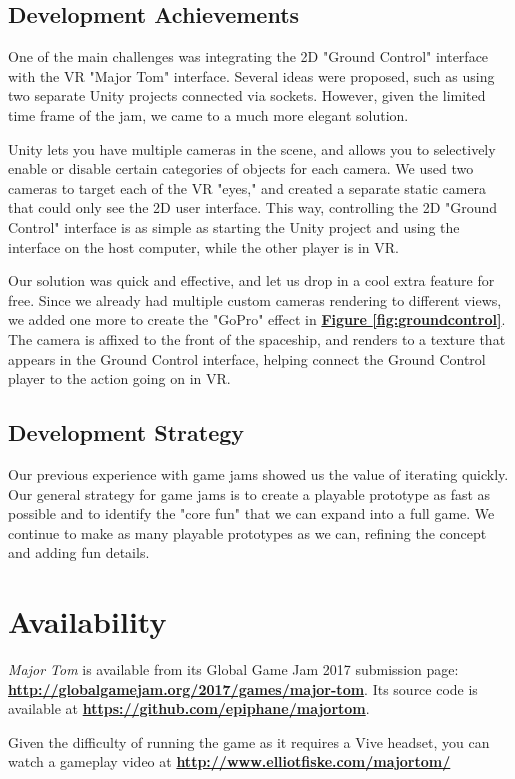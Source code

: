 \documentclass[sigconf]{acmart}
\begin{document}
\subsection{Development Achievements}
One of the main challenges was integrating the 2D "Ground Control" interface with the VR "Major Tom" interface. Several ideas were proposed, such as using two separate Unity projects connected via sockets. However, given the limited time frame of the jam, we came to a much more elegant solution. 

Unity lets you have multiple cameras in the scene, and allows you to selectively enable or disable certain categories of objects for each camera. We used two cameras to target each of the VR "eyes," and created a separate static camera that could only see the 2D user interface. This way, controlling the 2D "Ground Control" interface is as simple as starting the Unity project and using the interface on the host computer, while the other player is in VR.

Our solution was quick and effective, and let us drop in a cool extra feature for free. Since we already had multiple custom cameras rendering to different views, we added one more to create the "GoPro" effect in \textbf{\hyperref[fig:groundcontrol]{Figure \ref*{fig:groundcontrol}}}. The camera is affixed to the front of the spaceship, and renders to a texture that appears in the Ground Control interface, helping connect the Ground Control player to the action going on in VR.

\subsection{Development Strategy}
Our previous experience with game jams showed us the value of iterating quickly. Our general strategy for game jams is to create a playable prototype as fast as possible and to identify the "core fun" that we can expand into a full game. We continue to make as many playable prototypes as we can, refining the concept and adding fun details.

\section{Availability}
\textit{Major Tom} is available from its Global Game Jam 2017 submission page: \textbf{\href{http://globalgamejam.org/2017/games/major-tom}{http://globalgamejam.org/2017/games/major-tom}}. Its source code is available at \textbf{\href{https://github.com/epiphane/majortom}{https://github.com/epiphane/majortom}}.

Given the difficulty of running the game as it requires a Vive headset, you can watch a gameplay video at \textbf{\href{http://www.elliotfiske.com/majortom/}{http://www.elliotfiske.com/majortom/}}
\end{document}
